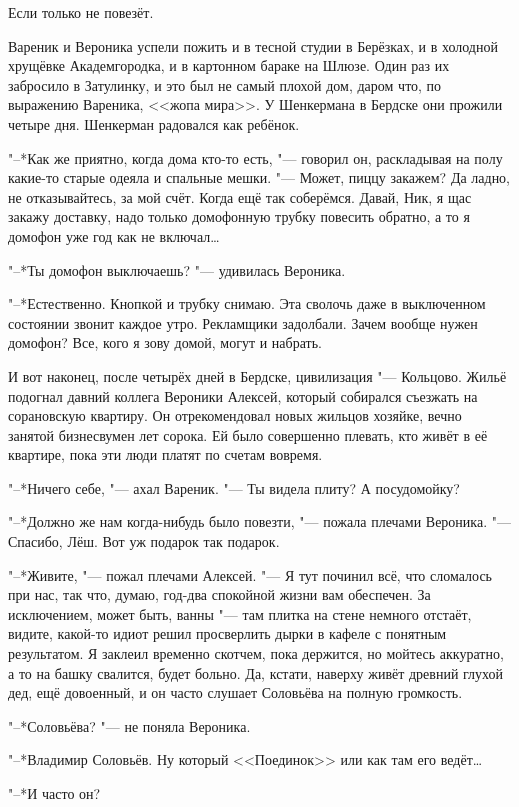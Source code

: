 Если только не повезёт.

Вареник и Вероника успели пожить и в тесной студии в Берёзках, и в холодной хрущёвке Академгородка, и в картонном бараке на Шлюзе.
Один раз их забросило в Затулинку, и это был не самый плохой дом, даром что, по выражению Вареника, <<жопа мира>>.
У Шенкермана в Бердске они прожили четыре дня.
Шенкерман радовался как ребёнок.

"--*Как же приятно, когда дома кто-то есть, "--- говорил он, раскладывая на полу какие-то старые одеяла и спальные мешки.
"--- Может, пиццу закажем?
Да ладно, не отказывайтесь, за мой счёт.
Когда ещё так соберёмся.
Давай, Ник, я щас закажу доставку, надо только домофонную трубку повесить обратно, а то я домофон уже год как не включал\ldots{}

"--*Ты домофон выключаешь? "--- удивилась Вероника.

"--*Естественно.
Кнопкой и трубку снимаю.
Эта сволочь даже в выключенном состоянии звонит каждое утро.
Рекламщики задолбали.
Зачем вообще нужен домофон?
Все, кого я зову домой, могут и набрать.

И вот наконец, после четырёх дней в Бердске, цивилизация "--- Кольцово.
Жильё подогнал давний коллега Вероники Алексей, который собирался съезжать на сорановскую квартиру.
Он отрекомендовал новых жильцов хозяйке, вечно занятой бизнесвумен лет сорока.
Ей было совершенно плевать, кто живёт в её квартире, пока эти люди платят по счетам вовремя.

"--*Ничего себе, "--- ахал Вареник.
"--- Ты видела плиту?
А посудомойку?

"--*Должно же нам когда-нибудь было повезти, "--- пожала плечами Вероника.
"--- Спасибо, Лёш.
Вот уж подарок так подарок.

"--*Живите, "--- пожал плечами Алексей.
"--- Я тут починил всё, что сломалось при нас, так что, думаю, год-два спокойной жизни вам обеспечен.
За исключением, может быть, ванны "--- там плитка на стене немного отстаёт, видите, какой-то идиот решил просверлить дырки в кафеле с понятным результатом.
Я заклеил временно скотчем, пока держится, но мойтесь аккуратно, а то на башку свалится, будет больно.
Да, кстати, наверху живёт древний глухой дед, ещё довоенный, и он часто слушает Соловьёва на полную громкость.

"--*Соловьёва? "--- не поняла Вероника.

"--*Владимир Соловьёв.
Ну который <<Поединок>> или как там его ведёт\ldots{}

"--*И часто он?

